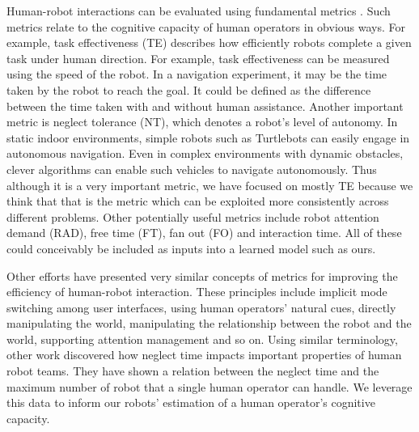 \documentclass{sig-alternate}
\begin{document}
Human-robot interactions can be evaluated using fundamental metrics
\cite{olsen2003metrics}. Such metrics relate to the cognitive capacity
of human operators in obvious ways. For example, task effectiveness
(TE) describes how efficiently robots complete a given task under
human direction.  For example, task effectiveness can be measured
using the speed of the robot. In a navigation experiment, it may be
the time taken by the robot to reach the goal.  It could be defined as
the difference between the time taken with and without human
assistance.  Another important metric is neglect tolerance (NT), which
denotes a robot's level of autonomy. In static indoor environments,
simple robots such as Turtlebots can easily engage in autonomous
navigation. Even in complex environments with dynamic obstacles,
clever algorithms \cite{montemerlo2008junior} can enable such vehicles
to navigate autonomously. Thus although it is a very important metric,
we have focused on mostly TE because we think that that is the metric
which can be exploited more consistently across different problems.
Other potentially useful metrics include robot attention demand (RAD),
free time (FT), fan out (FO) and interaction time.  All of these could
conceivably be included as inputs into a learned model such as ours.

Other efforts \cite{goodrich2003seven, olsen2003metrics} have
presented very similar concepts of metrics for improving the
efficiency of human-robot interaction. These principles include
implicit mode switching among user interfaces, using human operators'
natural cues, directly manipulating the world, manipulating the
relationship between the robot and the world, supporting attention
management and so on. Using similar terminology, other work
\cite{crandall2005validating} discovered how neglect time impacts
important properties of human robot teams. They have shown a relation
between the neglect time and the maximum number of robot that a single
human operator can handle.  We leverage this data to inform our
robots' estimation of a human operator's cognitive capacity.
\end{document}
